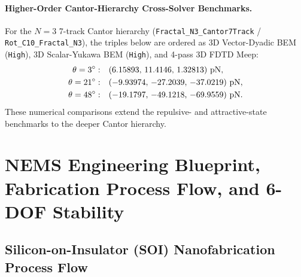 \documentclass[11pt,letterpaper]{article}
\begin{document}
\paragraph{Higher-Order Cantor-Hierarchy Cross-Solver Benchmarks.}
For the $N=3$ 7-track Cantor hierarchy (\texttt{Fractal\_N3\_Cantor7Track} / \texttt{Rot\_C10\_Fractal\_N3}), the triples below are ordered as 3D Vector-Dyadic BEM (\texttt{High}), 3D Scalar-Yukawa BEM (\texttt{High}), and 4-pass 3D FDTD Meep:
\begin{align*}
\theta=3^\circ:\quad&
(6.15893{},\,
 11.4146{},\,
 1.32813{})\text{ pN},\\
\theta=21^\circ:\quad&
(-9.93974{},\,
 -27.2039{},\,
 -37.0219{})\text{ pN},\\
\theta=48^\circ:\quad&
(-19.1797{},\,
 -49.1218{},\,
 -69.9559{})\text{ pN}.
\end{align*}
These numerical comparisons extend the repulsive- and attractive-state benchmarks to the deeper Cantor hierarchy.


\section{NEMS Engineering Blueprint, Fabrication Process Flow, and 6-DOF Stability}
\label{sec:experimental}

\subsection{Silicon-on-Insulator (SOI) Nanofabrication Process Flow}
\end{document}
